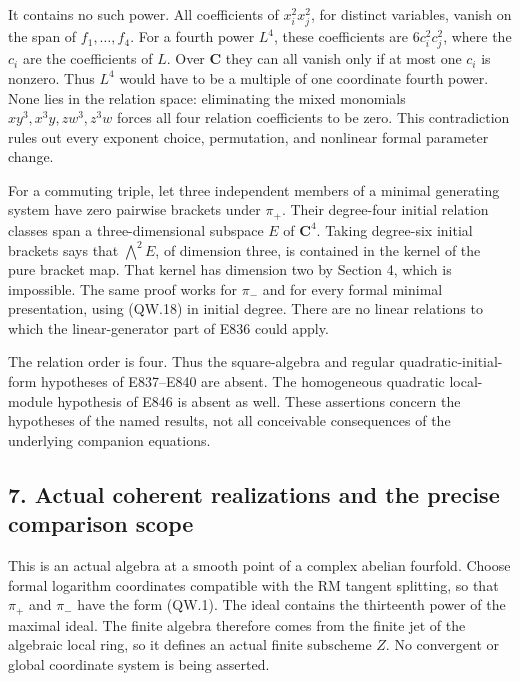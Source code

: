 It contains no such power. All coefficients of \(x_i^2x_j^2\), for
distinct variables, vanish on the span of \(f_1,\ldots,f_4\). For a fourth
power \(L^4\), these coefficients are \(6c_i^2c_j^2\), where the \(c_i\) are the
coefficients of \(L\). Over \(\mathbf C\) they can all vanish only if at most one
\(c_i\) is nonzero. Thus \(L^4\) would have to be a multiple of one
coordinate fourth power. None lies in the relation space: eliminating
the mixed monomials \(xy^3,x^3y,zw^3,z^3w\) forces all four relation
coefficients to be zero. This contradiction rules out every exponent
choice, permutation, and nonlinear formal parameter change.

For a commuting triple, let three independent members of a minimal
generating system have zero pairwise brackets under \(\pi_+\). Their
degree-four initial relation classes span a three-dimensional
subspace \(E\) of \(\mathbf C^4\). Taking degree-six initial brackets says that
\(\bigwedge^2E\), of dimension three, is contained in the kernel of the
pure bracket map. That kernel has dimension two by Section 4,
which is impossible. The same proof works for \(\pi_-\) and for every
formal minimal presentation, using (QW.18) in initial degree.
There are no linear relations to which the linear-generator part
of E836 could apply.

The relation order is four. Thus the square-algebra and regular
quadratic-initial-form hypotheses of E837--E840 are absent. The
homogeneous quadratic local-module hypothesis of E846 is absent
as well. These assertions concern the hypotheses of the named
results, not all conceivable consequences of the underlying
companion equations.

\subsection{7. Actual coherent realizations and the precise comparison scope}\label{SF-E848W:s7}

This is an actual algebra at a smooth point of a complex abelian
fourfold. Choose formal logarithm coordinates compatible with the
RM tangent splitting, so that \(\pi_+\) and \(\pi_-\) have the form (QW.1).
The ideal contains the thirteenth power of the maximal ideal.
The finite algebra therefore comes from the finite jet of the
algebraic local ring, so it defines an actual finite subscheme \(Z\).
No convergent or global coordinate system is being asserted.

